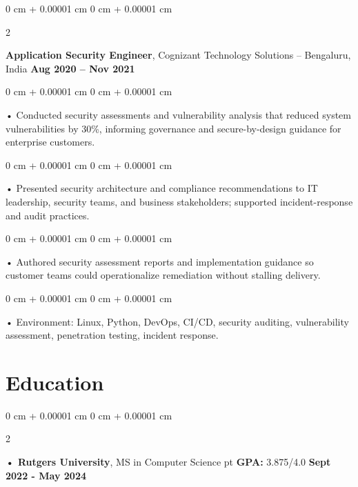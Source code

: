 \documentclass[10pt, letterpaper]{article}
\newenvironment{onecolentry}{
    \begin{adjustwidth}{
        0 cm + 0.00001 cm
    }{
        0 cm + 0.00001 cm
    }
}{
    \end{adjustwidth}
} %
\newenvironment{twocolentry}[2][]{
    \onecolentry
    \def\secondColumn{#2}
    \setcolumnwidth{\fill, 4.5 cm}
    \begin{paracol}{2}
}{
    \switchcolumn \raggedleft \secondColumn
    \end{paracol}
    \endonecolentry
} %
\begin{document}
        \begin{twocolentry}{
            \textbf{Aug 2020 – Nov 2021}
        }
            \vspace{2 pt }
            \textbf{Application Security Engineer}, Cognizant Technology Solutions -- Bengaluru, India\end{twocolentry}
        \begin{onecolentry}
             • Conducted security assessments and vulnerability analysis that reduced system vulnerabilities by 30\%, informing governance and secure-by-design guidance for enterprise customers.
        \end{onecolentry}
        \begin{onecolentry}
             • Presented security architecture and compliance recommendations to IT leadership, security teams, and business stakeholders; supported incident-response and audit practices.
        \end{onecolentry}
        \begin{onecolentry}
             • Authored security assessment reports and implementation guidance so customer teams could operationalize remediation without stalling delivery.
        \end{onecolentry}

        \begin{onecolentry}
             • Environment: Linux, Python, DevOps, CI/CD, security auditing, vulnerability assessment, penetration testing, incident response.
        \end{onecolentry}
    \vspace{2 pt }
        \section{Education}
        \vspace{2 pt }
        \begin{twocolentry}{
            \textbf{Sept 2022 - May 2024}
        }
            \textbf{ • Rutgers University}, MS in Computer Science  pt \textbf{GPA:} 3.875/4.0  \end{twocolentry}
\end{document}
